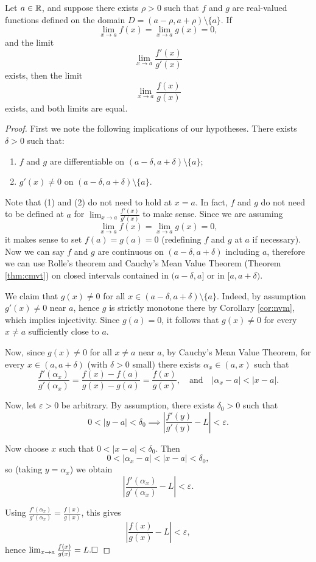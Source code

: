 \documentclass[../analysis1.tex]{subfiles}
\begin{document}
\begin{theorem}
    \begin{shaded*}
        Let $a \in \mathbb{R}$, and suppose there exists $\rho > 0$ such that $f$ and $g$ are real-valued functions defined on the domain $D = (a - \rho, a + \rho) \setminus \{a\}$. If \[\lim_{x\to a}f(x)=\lim_{x\to a}g(x)=0,\]
        and the limit \[\lim_{x\to a}\frac{f'(x)}{g'(x)}\]
        exists, then the limit \[\lim_{x\to a}\frac{f(x)}{g(x)}\]
        exists, and both limits are equal.
    \end{shaded*}
\end{theorem}
\begin{proof}
    First we note the following implications of our hypotheses. There exists $\delta > 0$ such that:
\begin{enumerate}
    \item[1.] $f$ and $g$ are differentiable on $(a - \delta, a + \delta) \setminus \{a\}$;
    \item[2.] $g'(x) \neq 0$ on $(a - \delta, a + \delta) \setminus \{a\}$.
\end{enumerate}
Note that (1) and (2) do not need to hold at $x = a$. In fact, $f$ and $g$ do not need to be defined at $a$ for $\lim_{x\to a} \frac{f'(x)}{g'(x)}$ to make sense. Since we are assuming
\[
\lim_{x\to a} f(x) = \lim_{x\to a} g(x) = 0,
\]
it makes sense to set $f(a) = g(a) = 0$ (redefining $f$ and $g$ at $a$ if necessary). Now we can say $f$ and $g$ are continuous on $(a - \delta, a + \delta)$ including $a$, therefore we can use Rolle's theorem and Cauchy's Mean Value Theorem (Theorem \ref{thm:cmvt}) on closed intervals contained in $(a - \delta, a]$ or in $[a, a + \delta)$.

We claim that $g(x) \neq 0$ for all $x \in (a - \delta, a + \delta) \setminus \{a\}$. Indeed, by assumption $g'(x) \neq 0$ near $a$, hence $g$ is strictly monotone there by Corollary \ref{cor:nvm}, which implies injectivity. Since $g(a) = 0$, it follows that $g(x) \neq 0$ for every $x \neq a$ sufficiently close to $a$.

Now, since $g(x) \neq 0$ for all $x \neq a$ near $a$, by Cauchy's Mean Value Theorem, for every $x \in (a, a + \delta)$ (with $\delta > 0$ small) there exists $\alpha_x \in (a, x)$ such that
\[
\frac{f'(\alpha_x)}{g'(\alpha_x)} = \frac{f(x) - f(a)}{g(x) - g(a)} = \frac{f(x)}{g(x)}, \quad \text{and} \quad |\alpha_x - a| < |x - a|.
\]

Now, let $\varepsilon > 0$ be arbitrary. By assumption, there exists $\delta_0 > 0$ such that
\[
0 < |y - a| < \delta_0 \implies \left| \frac{f'(y)}{g'(y)} - L \right| < \varepsilon.
\]

Now choose $x$ such that $0 < |x - a| < \delta_0$. Then
\[
0 < |\alpha_x - a| < |x - a| < \delta_0,
\]
so (taking $y = \alpha_x$) we obtain
\[
\left| \frac{f'(\alpha_x)}{g'(\alpha_x)} - L \right| < \varepsilon.
\]

Using $\frac{f'(\alpha_x)}{g'(\alpha_x)} = \frac{f(x)}{g(x)}$, this gives
\[
\left| \frac{f(x)}{g(x)} - L \right| < \varepsilon,
\]
hence $\lim_{x\to a} \frac{f(x)}{g(x)} = L. \hfill \square$
\end{proof}
\end{document}
